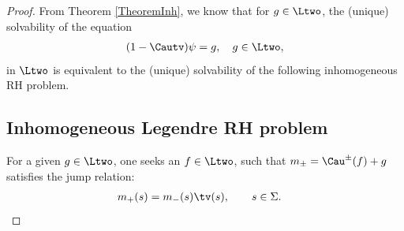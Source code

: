 \begin{proof}
From Theorem \ref{TheoremInh}, we know that for $g \in \Ltwo$, the (unique) solvability of the equation
\begin{align}\label{SingIE}
(1-\Cautv)\psi = g, \quad g\in \Ltwo,
\end{align}
in $\Ltwo$ is equivalent to the (unique) solvability of the following inhomogeneous RH problem.

\subsection*{Inhomogeneous Legendre RH problem}
For a given $g \in \Ltwo$, one seeks an $f \in \Ltwo$, such that $m_\pm = \Cau^\pm(f)+g$ satisfies the jump relation:
\begin{align*}
 m_+(s) &= m_-(s) \tv(s), \qquad s \in \Sigma.
\end{align*}


\end{proof}
